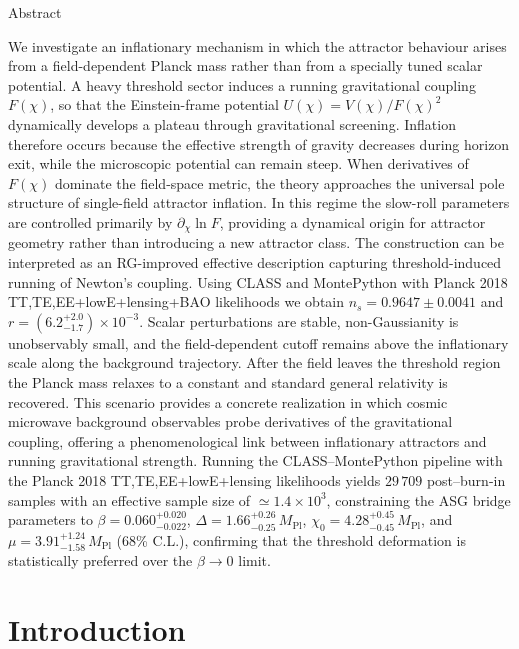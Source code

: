 \documentclass[
]{article}
\author{}
\date{}
\begin{document}
Abstract

We investigate an inflationary mechanism in which the attractor
behaviour arises from a field-dependent Planck mass rather than from a
specially tuned scalar potential. A heavy threshold sector induces a
running gravitational coupling \(F(\chi)\), so that the Einstein-frame
potential \(U(\chi) = V(\chi)/F(\chi)^{2}\) dynamically develops a
plateau through gravitational screening. Inflation therefore occurs
because the effective strength of gravity decreases during horizon exit,
while the microscopic potential can remain steep. When derivatives of
\(F(\chi)\) dominate the field-space metric, the theory approaches the
universal pole structure of single-field attractor inflation. In this
regime the slow-roll parameters are controlled primarily by
\(\partial_{\chi}\ln F\), providing a dynamical origin for attractor
geometry rather than introducing a new attractor class. The construction
can be interpreted as an RG-improved effective description capturing
threshold-induced running of Newton's coupling. Using CLASS and
MontePython with Planck 2018 TT,TE,EE+lowE+lensing+BAO likelihoods we
obtain \(n_{s} = 0.9647 \pm 0.0041\) and
\(r = ({6.2}_{- 1.7}^{+ 2.0}) \times 10^{- 3}\). Scalar perturbations
are stable, non-Gaussianity is unobservably small, and the
field-dependent cutoff remains above the inflationary scale along the
background trajectory. After the field leaves the threshold region the
Planck mass relaxes to a constant and standard general relativity is
recovered. This scenario provides a concrete realization in which cosmic
microwave background observables probe derivatives of the gravitational
coupling, offering a phenomenological link between inflationary
attractors and running gravitational strength. Running the
CLASS--MontePython pipeline with the Planck 2018 TT,TE,EE+lowE+lensing
likelihoods yields \(29\,709\) post--burn-in samples with an effective
sample size of \(\simeq 1.4\times 10^{3}\), constraining the ASG bridge
parameters to \(\beta = 0.060^{+0.020}_{-0.022}\),
\(\Delta = 1.66^{+0.26}_{-0.25}\,M_{\mathrm{Pl}}\),
\(\chi_{0} = 4.28^{+0.45}_{-0.45}\,M_{\mathrm{Pl}}\), and
\(\mu = 3.91^{+1.24}_{-1.58}\,M_{\mathrm{Pl}}\) (68\% C.L.), confirming
that the threshold deformation is statistically preferred over the
\(\beta \to 0\) limit.

\section{Introduction}\label{introduction}
\end{document}
